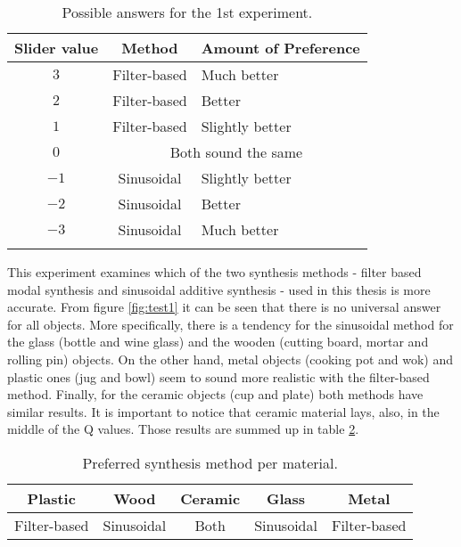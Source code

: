 \begin{table}[H]
	\centering
    \begin{tabular}{ c  c  l  }
    \toprule
    \textbf{Slider value} & \textbf{Method} & \textbf{Amount of Preference} \\ \toprule
    \addlinespace
    $3$ & Filter-based & Much better  \\
    $2$ & Filter-based & Better \\
    $1$ & Filter-based & Slightly better \\ 
    \addlinespace
    $0$ & \multicolumn{2}{c}{Both sound the same} \\
    \addlinespace
    $-1$ & Sinusoidal & Slightly better \\ 
    $-2$ & Sinusoidal & Better \\ 
    $-3$ & Sinusoidal & Much better \\
    \addlinespace
    \bottomrule
    \end{tabular}
    \caption{Possible answers for the 1st experiment.}
    \label{tab:test1_ans}
\end{table}  

This experiment examines which of the two synthesis methods - filter based modal synthesis and sinusoidal additive synthesis - used in this thesis is more accurate. From figure \ref{fig:test1} it can be seen that there is no universal answer for all objects. More specifically, there is a tendency for the sinusoidal method for the glass (bottle and wine glass) and the wooden (cutting board, mortar and rolling pin) objects. On the other hand, metal objects (cooking pot and wok) and plastic ones (jug and bowl) seem to sound more realistic with the filter-based method. Finally, for the ceramic objects (cup and plate) both methods have similar results. It is important to notice that ceramic material lays, also, in the middle of the \gls{Q} values. Those results are summed up in table \ref{tab:method_mat}.

\begin{table}[H]
	\centering
    \begin{tabular}{ c  c  c c c }
    \toprule
    \textbf{Plastic} & \textbf{Wood} & \textbf{Ceramic} & \textbf{Glass} & \textbf{Metal} \\ \toprule
    Filter-based & Sinusoidal & Both & Sinusoidal & Filter-based  \\
    \bottomrule
    \end{tabular}
    \caption{Preferred synthesis method per material.}
    \label{tab:method_mat}
\end{table} 


